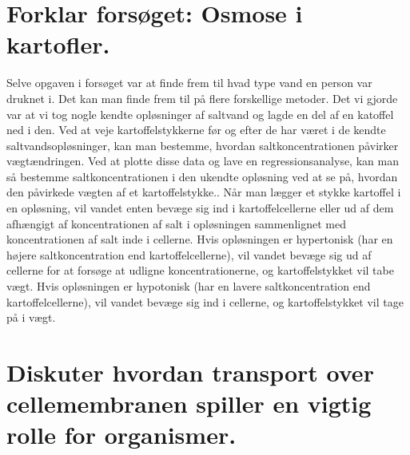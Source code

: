     \section{Forklar forsøget: Osmose i kartofler.}
        Selve opgaven i forsøget var at finde frem til hvad type vand en person var druknet i. Det kan man finde frem til på flere forskellige metoder. Det vi gjorde var at vi tog nogle kendte opløsninger af saltvand og lagde en del af en katoffel ned i den. Ved at veje kartoffelstykkerne før og efter de har været i de kendte saltvandsopløsninger, kan man bestemme, hvordan saltkoncentrationen påvirker vægtændringen. Ved at plotte disse data og lave en regressionsanalyse, kan man så bestemme saltkoncentrationen i den ukendte opløsning ved at se på, hvordan den påvirkede vægten af et kartoffelstykke.. Når man lægger et stykke kartoffel i en opløsning, vil vandet enten bevæge sig ind i kartoffelcellerne eller ud af dem afhængigt af koncentrationen af salt i opløsningen sammenlignet med koncentrationen af salt inde i cellerne. Hvis opløsningen er hypertonisk (har en højere saltkoncentration end kartoffelcellerne), vil vandet bevæge sig ud af cellerne for at forsøge at udligne koncentrationerne, og kartoffelstykket vil tabe vægt. Hvis opløsningen er hypotonisk (har en lavere saltkoncentration end kartoffelcellerne), vil vandet bevæge sig ind i cellerne, og kartoffelstykket vil tage på i vægt.
    \section{Diskuter hvordan transport over cellemembranen spiller en vigtig rolle for organismer.} %


